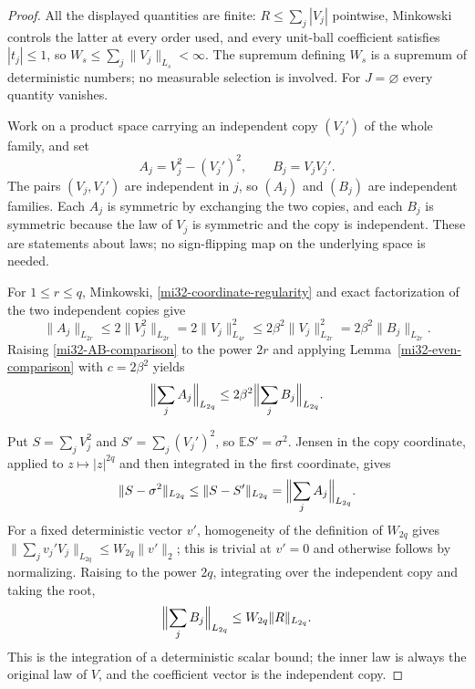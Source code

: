 \documentclass[11pt]{article}
\theoremstyle{definition}
\theoremstyle{remark}
\newcommand{\E}{\mathbb E}
\newcommand{\norm}[1]{\lVert#1\rVert}
\begin{document}
\begin{proof}
All the displayed quantities are finite: $R\le\sum_j|V_j|$ pointwise,
Minkowski controls the latter at every order used, and every unit-ball
coefficient satisfies $|t_j|\le1$, so
$W_s\le\sum_j\norm{V_j}_{L_s}<\infty$. The supremum defining $W_s$ is a
supremum of deterministic numbers; no measurable selection is involved.
For $J=\varnothing$ every quantity vanishes.

Work on a product space carrying an independent copy $(V_j')$ of the
whole family, and set
\[
 A_j=V_j^2-(V_j')^2,\qquad B_j=V_jV_j'.
\]
The pairs $(V_j,V_j')$ are independent in $j$, so $(A_j)$ and $(B_j)$
are independent families. Each $A_j$ is symmetric by exchanging the two
copies, and each $B_j$ is symmetric because the law of $V_j$ is
symmetric and the copy is independent. These are statements about laws;
no sign-flipping map on the underlying space is needed.

For $1\le r\le q$, Minkowski, \eqref{mi32-coordinate-regularity} and
exact factorization of the two independent copies give
\begin{equation}\label{mi32-AB-comparison}
 \norm{A_j}_{L_{2r}}\le2\norm{V_j^2}_{L_{2r}}
   =2\norm{V_j}_{L_{4r}}^2
   \le2\beta^2\norm{V_j}_{L_{2r}}^2
   =2\beta^2\norm{B_j}_{L_{2r}}.
\end{equation}
Raising \eqref{mi32-AB-comparison} to the power $2r$ and applying
Lemma~\ref{mi32-even-comparison} with $c=2\beta^2$ yields
\begin{equation}\label{mi32-AB-sums}
 \Bigl\|\sum_jA_j\Bigr\|_{L_{2q}}
 \le2\beta^2\Bigl\|\sum_jB_j\Bigr\|_{L_{2q}}.
\end{equation}

Put $S=\sum_jV_j^2$ and $S'=\sum_j(V_j')^2$, so $\E S'=\sigma^2$.
Jensen in the copy coordinate, applied to $z\mapsto|z|^{2q}$ and then
integrated in the first coordinate, gives
\begin{equation}\label{mi32-jensen-copy}
 \norm{S-\sigma^2}_{L_{2q}}\le\norm{S-S'}_{L_{2q}}
 =\Bigl\|\sum_jA_j\Bigr\|_{L_{2q}} .
\end{equation}
For a fixed deterministic vector $v'$, homogeneity of the definition of
$W_{2q}$ gives $\norm{\sum_jv_j'V_j}_{L_{2q}}\le W_{2q}\norm{v'}_2$;
this is trivial at $v'=0$ and otherwise follows by normalizing.
Raising to the power $2q$, integrating over the independent copy and
taking the root,
\begin{equation}\label{mi32-B-weak}
 \Bigl\|\sum_jB_j\Bigr\|_{L_{2q}}\le W_{2q}\norm{R}_{L_{2q}}.
\end{equation}
This is the integration of a deterministic scalar bound; the inner law
is always the original law of $V$, and the coefficient vector is the
independent copy.


\end{proof}
\end{document}
